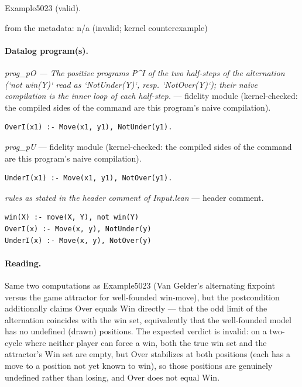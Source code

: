 \documentclass[10pt]{article}
\begin{document}
\begin{description}[leftmargin=2.6cm,style=nextline,itemsep=1pt]
\item[Twin] Example5023 (valid).

\item[Obstruction note] from the metadata: n/a (invalid; kernel counterexample)

\end{description}

\paragraph{Datalog program(s).}

{\raggedright\textit{prog\_pO --- The positive programs P\textasciicircum{}I of the two half-steps of the alternation (`not win(Y)` read as `NotUnder(Y)`, resp. `NotOver(Y)`); their naive compilation is the inner loop of each half-step.} --- fidelity module (kernel-checked: the compiled sides of the command are this program's naive compilation).\par}

\begin{Verbatim}[fontsize=\scriptsize,breaklines=true,breakanywhere=true,frame=single,framesep=1.5mm]
OverI(x1) :- Move(x1, y1), NotUnder(y1).
\end{Verbatim}

{\raggedright\textit{prog\_pU} --- fidelity module (kernel-checked: the compiled sides of the command are this program's naive compilation).\par}

\begin{Verbatim}[fontsize=\scriptsize,breaklines=true,breakanywhere=true,frame=single,framesep=1.5mm]
UnderI(x1) :- Move(x1, y1), NotOver(y1).
\end{Verbatim}

{\raggedright\textit{rules as stated in the header comment of Input.lean} --- header comment.\par}

\begin{Verbatim}[fontsize=\scriptsize,breaklines=true,breakanywhere=true,frame=single,framesep=1.5mm]
win(X) :- move(X, Y), not win(Y)
OverI(x) :- Move(x, y), NotUnder(y)
UnderI(x) :- Move(x, y), NotOver(y)
\end{Verbatim}

\paragraph{Reading.} Same two computations as Example5023 (Van Gelder's alternating fixpoint versus the game attractor for well-founded win-move), but the postcondition additionally claims Over equals Win directly --- that the odd limit of the alternation coincides with the win set, equivalently that the well-founded model has no undefined (drawn) positions. The expected verdict is invalid: on a two-cycle where neither player can force a win, both the true win set and the attractor's Win set are empty, but Over stabilizes at both positions (each has a move to a position not yet known to win), so those positions are genuinely undefined rather than losing, and Over does not equal Win.
\end{document}
